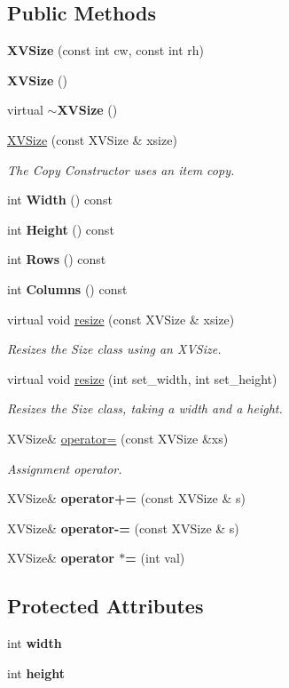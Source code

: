 \subsection*{Public Methods}
\begin{CompactItemize}
\item 
{\bf XVSize} (const int cw, const int rh)
\item 
{\bf XVSize} ()
\item 
virtual {\bf $\sim$XVSize} ()
\item 
\hyperlink{class_XVSize_a3}{XVSize} (const XVSize \& xsize)
\begin{CompactList}\small\item\em The Copy Constructor uses an item copy.\item\end{CompactList}\item 
int {\bf Width} () const
\item 
int {\bf Height} () const
\item 
int {\bf Rows} () const
\item 
int {\bf Columns} () const
\item 
virtual void \hyperlink{class_XVSize_a8}{resize} (const XVSize \& xsize)
\begin{CompactList}\small\item\em Resizes the Size class using an XVSize.\item\end{CompactList}\item 
virtual void \hyperlink{class_XVSize_a9}{resize} (int set\_\-width, int set\_\-height)
\begin{CompactList}\small\item\em Resizes the Size class, taking a width and a height.\item\end{CompactList}\item 
XVSize\& \hyperlink{class_XVSize_a10}{operator=} (const XVSize \&xs)
\begin{CompactList}\small\item\em Assignment operator.\item\end{CompactList}\item 
XVSize\& {\bf operator+=} (const XVSize \& s)
\item 
XVSize\& {\bf operator-=} (const XVSize \& s)
\item 
XVSize\& {\bf operator $\ast$=} (int val)
\end{CompactItemize}
\subsection*{Protected Attributes}
\begin{CompactItemize}
\item 
int {\bf width}
\item 
int {\bf height}
\end{CompactItemize}


